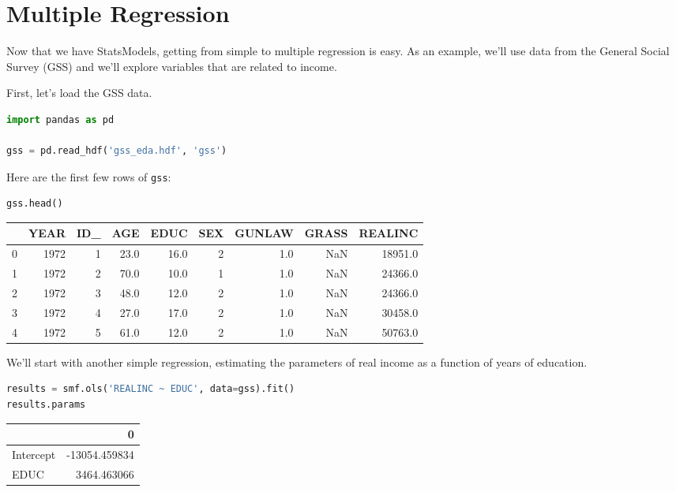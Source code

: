 \hypertarget{multiple-regression}{%
\section{Multiple Regression}\label{multiple-regression}}

Now that we have StatsModels, getting from simple to multiple regression
is easy. As an example, we'll use data from the General Social Survey
(GSS) and we'll explore variables that are related to income.

First, let's load the GSS data.

\begin{lstlisting}[language=Python,style=source]
import pandas as pd

gss = pd.read_hdf('gss_eda.hdf', 'gss')
\end{lstlisting}

Here are the first few rows of \passthrough{\lstinline!gss!}:

\begin{lstlisting}[language=Python,style=source]
gss.head()
\end{lstlisting}

\begin{tabular}{lrrrrrrrr}
\toprule
{} &  YEAR &  ID\_ &   AGE &  EDUC &  SEX &  GUNLAW &  GRASS &  REALINC \\
\midrule
0 &  1972 &    1 &  23.0 &  16.0 &    2 &     1.0 &    NaN &  18951.0 \\
1 &  1972 &    2 &  70.0 &  10.0 &    1 &     1.0 &    NaN &  24366.0 \\
2 &  1972 &    3 &  48.0 &  12.0 &    2 &     1.0 &    NaN &  24366.0 \\
3 &  1972 &    4 &  27.0 &  17.0 &    2 &     1.0 &    NaN &  30458.0 \\
4 &  1972 &    5 &  61.0 &  12.0 &    2 &     1.0 &    NaN &  50763.0 \\
\bottomrule
\end{tabular}

We'll start with another simple regression, estimating the parameters of
real income as a function of years of education.

\begin{lstlisting}[language=Python,style=source]
results = smf.ols('REALINC ~ EDUC', data=gss).fit()
results.params
\end{lstlisting}

\begin{tabular}{lr}
\toprule
{} &             0 \\
\midrule
Intercept & -13054.459834 \\
EDUC      &   3464.463066 \\
\bottomrule
\end{tabular}

